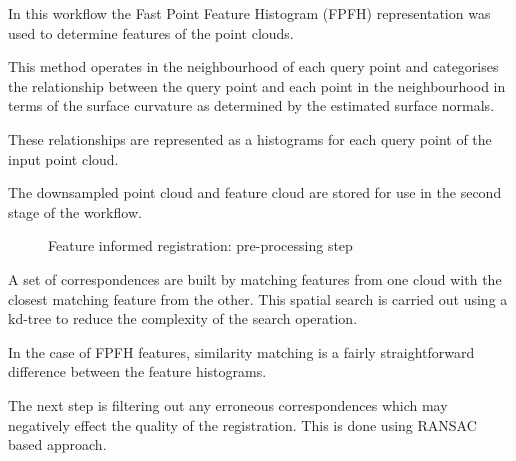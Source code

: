 \documentclass{entcs}
\begin{document}
In this workflow the Fast Point Feature Histogram (FPFH)
\cite{Rusu_ICRA2011_PCL} representation was used to determine features of the
point clouds.

This method operates in the neighbourhood of each query point and categorises
the relationship between the query point and each point in the neighbourhood in
terms of the surface curvature as determined by the estimated surface normals.

These relationships are represented as a histograms for each query point of the
input point cloud.

The downsampled point cloud and feature cloud are stored for use in the second
stage of the workflow.

\begin{figure}[h!]
  \centering
  \caption{Feature informed registration: pre-processing step}
  \label{fig:feature_informed_registration_workflow_1}
\end{figure}

A set of correspondences are built by matching features from one cloud with the
closest matching feature from the other. This spatial search is carried out
using a kd-tree to reduce the complexity of the search operation.
\cite{Holz2015}

In the case of FPFH features, similarity matching is a fairly straightforward
difference between the feature histograms.

The next step is filtering out any erroneous correspondences which may
negatively effect the quality of the registration. This is done using RANSAC
\cite{Fischler1981} based approach.
\end{document}
